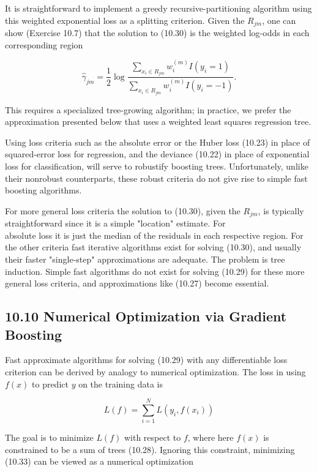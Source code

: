 \documentclass[10pt]{article}
\begin{document}
It is straightforward to implement a greedy recursive-partitioning algorithm using this weighted exponential loss as a splitting criterion. Given the $R_{j m}$, one can show (Exercise 10.7) that the solution to (10.30) is the weighted log-odds in each corresponding region


\begin{equation*}
\hat{\gamma}_{j m}=\frac{1}{2} \log \frac{\sum_{x_{i} \in R_{j m}} w_{i}^{(m)} I\left(y_{i}=1\right)}{\sum_{x_{i} \in R_{j m}} w_{i}^{(m)} I\left(y_{i}=-1\right)} . \tag{10.32}
\end{equation*}


This requires a specialized tree-growing algorithm; in practice, we prefer the approximation presented below that uses a weighted least squares regression tree.

Using loss criteria such as the absolute error or the Huber loss (10.23) in place of squared-error loss for regression, and the deviance (10.22) in place of exponential loss for classification, will serve to robustify boosting trees. Unfortunately, unlike their nonrobust counterparts, these robust criteria do not give rise to simple fast boosting algorithms.

For more general loss criteria the solution to (10.30), given the $R_{j m}$, is typically straightforward since it is a simple "location" estimate. For\\
absolute loss it is just the median of the residuals in each respective region. For the other criteria fast iterative algorithms exist for solving (10.30), and usually their faster "single-step" approximations are adequate. The problem is tree induction. Simple fast algorithms do not exist for solving (10.29) for these more general loss criteria, and approximations like (10.27) become essential.

\subsection*{10.10 Numerical Optimization via Gradient Boosting}
Fast approximate algorithms for solving (10.29) with any differentiable loss criterion can be derived by analogy to numerical optimization. The loss in using $f(x)$ to predict $y$ on the training data is


\begin{equation*}
L(f)=\sum_{i=1}^{N} L\left(y_{i}, f\left(x_{i}\right)\right) \tag{10.33}
\end{equation*}


The goal is to minimize $L(f)$ with respect to $f$, where here $f(x)$ is constrained to be a sum of trees (10.28). Ignoring this constraint, minimizing (10.33) can be viewed as a numerical optimization
\end{document}
